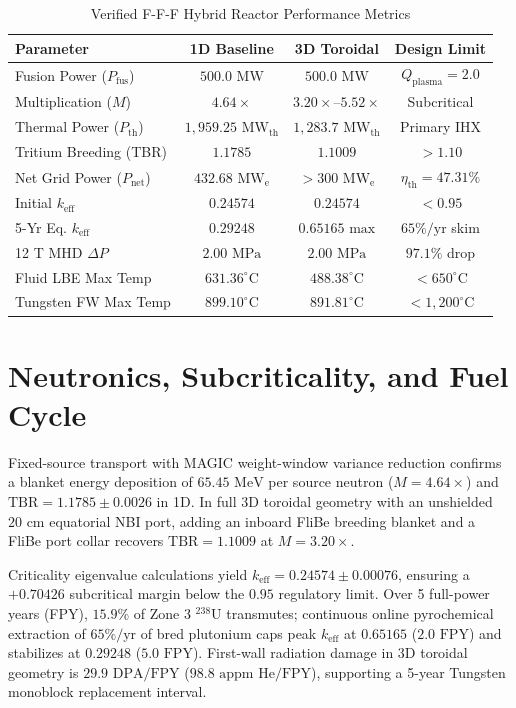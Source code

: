 \documentclass[11pt,twocolumn]{article}
\begin{document}
\begin{table}[h!]
\centering
\caption{Verified F-F-F Hybrid Reactor Performance Metrics}
\label{tab:summary}
\scriptsize
\begin{tabular}{@{}lccc@{}}
\toprule
\textbf{Parameter} & \textbf{1D Baseline} & \textbf{3D Toroidal} & \textbf{Design Limit} \\
\midrule
Fusion Power ($P_{\text{fus}}$) & $500.0\text{ MW}$ & $500.0\text{ MW}$ & $Q_{\text{plasma}} = 2.0$ \\
Multiplication ($M$) & $4.64\times$ & $3.20\times$--$5.52\times$ & Subcritical \\
Thermal Power ($P_{\text{th}}$) & $1,959.25\text{ MW}_{\text{th}}$ & $1,283.7\text{ MW}_{\text{th}}$ & Primary IHX \\
Tritium Breeding (TBR) & $1.1785$ & $1.1009$ & $> 1.10$ \\
Net Grid Power ($P_{\text{net}}$) & $432.68\text{ MW}_{\text{e}}$ & $> 300\text{ MW}_{\text{e}}$ & $\eta_{\text{th}} = 47.31\%$ \\
Initial $k_{\text{eff}}$ & $0.24574$ & $0.24574$ & $< 0.95$ \\
5-Yr Eq. $k_{\text{eff}}$ & $0.29248$ & $0.65165\text{ max}$ & $65\%/\text{yr}$ skim \\
12 T MHD $\Delta P$ & $2.00\text{ MPa}$ & $2.00\text{ MPa}$ & $97.1\%$ drop \\
Fluid LBE Max Temp & $631.36^\circ\text{C}$ & $488.38^\circ\text{C}$ & $< 650^\circ\text{C}$ \\
Tungsten FW Max Temp & $899.10^\circ\text{C}$ & $891.81^\circ\text{C}$ & $< 1,200^\circ\text{C}$ \\
\bottomrule
\end{tabular}
\end{table}

\section{Neutronics, Subcriticality, and Fuel Cycle}
Fixed-source transport with MAGIC weight-window variance reduction confirms a blanket energy deposition of $65.45\text{ MeV}$ per source neutron ($M = 4.64\times$) and $\mathrm{TBR} = 1.1785 \pm 0.0026$ in 1D. In full 3D toroidal geometry with an unshielded $20\text{ cm}$ equatorial NBI port, adding an inboard FliBe breeding blanket and a FliBe port collar recovers $\mathrm{TBR} = 1.1009$ at $M = 3.20\times$.

Criticality eigenvalue calculations yield $k_{\text{eff}} = 0.24574 \pm 0.00076$, ensuring a $+0.70426$ subcritical margin below the $0.95$ regulatory limit. Over 5 full-power years (FPY), $15.9\%$ of Zone 3 $^{238}\mathrm{U}$ transmutes; continuous online pyrochemical extraction of $65\%/\text{yr}$ of bred plutonium caps peak $k_{\text{eff}}$ at $0.65165$ ($2.0\text{ FPY}$) and stabilizes at $0.29248$ ($5.0\text{ FPY}$). First-wall radiation damage in 3D toroidal geometry is $29.9\text{ DPA/FPY}$ ($98.8\text{ appm He/FPY}$), supporting a 5-year Tungsten monoblock replacement interval.
\end{document}
